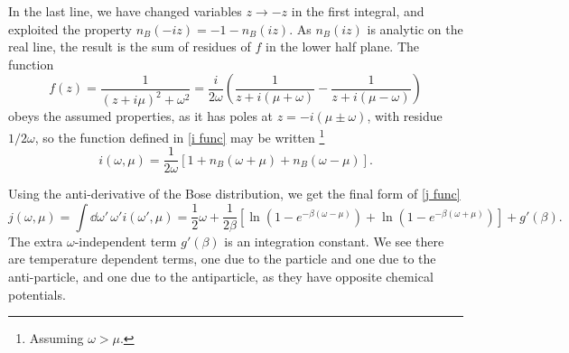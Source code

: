 In the last line, we have changed variables $z \rightarrow -z$ in the first integral, and exploited the property $n_B(-i z) = -1 - n_B(iz)$.
As $n_B(iz)$ is analytic on the real line, the result is the sum of residues of $f$ in the lower half plane.
The function
\begin{equation}
    f(z) = \frac{1}{(z + i \mu)^2 + \omega^2} 
    = \frac{i}{2 \omega } 
    \left(
        \frac{1}{z + i(\mu + \omega)} - \frac{1}{z + i(\mu - \omega)}
    \right)
\end{equation}
obeys the assumed properties, as it has poles at
$z = - i (\mu \pm \omega)$, with residue $1 / 2 \omega$, so the function defined in \autoref{i func} may be written \footnote{Assuming $\omega>\mu$.}
\begin{equation}
    i(\omega, \mu) 
    = \frac{1}{2\omega}
    [1 + n_B(\omega + \mu) + n_B(\omega - \mu)].
\end{equation}

Using the anti-derivative of the Bose distribution, we get the final form of \autoref{j func}
\begin{equation}
    j(\omega, \mu) = \int \dd \omega'\, \omega' i(\omega', \mu)
    =  
    \frac{1}{2}\omega + \frac{1}{2\beta} 
    \left[
        \ln\left(1 - e^{-\beta(\omega - \mu)}\right)
        + \ln\left(1 - e^{-\beta(\omega + \mu)}\right)
    \right]
    + g'(\beta).
\end{equation}
The extra $\omega$-independent term $g'(\beta)$ is an integration constant.
We see there are temperature dependent terms, one due to the particle and one due to the anti-particle, and one due to the antiparticle, as they have opposite chemical potentials.

